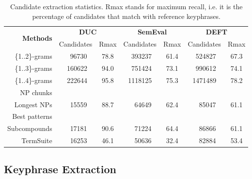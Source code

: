    \begin{table}[h]
      \centering
      \begin{tabular}{rcccccc}
        \toprule
        \multirow{2}{*}[-2pt]{\textbf{Methods}} & \multicolumn{2}{c}{\textbf{DUC}} & \multicolumn{2}{c}{\textbf{SemEval}} & \multicolumn{2}{c}{\textbf{DEFT}}\\
        \cmidrule(r){2-3}\cmidrule(lr){4-5}\cmidrule(l){6-7}
        & Candidates & Rmax & Candidates & Rmax & Candidates & Rmax\\
        \midrule
        \{1..2\}-grams & $~~~~$96730 & 78.8 & $~~$393237 & 61.4 & $~~$524827 & 67.3\\
        \{1..3\}-grams & $~~$160622 & 94.0 & $~~$751424 & 73.1 & $~~$990612 & 74.1\\
        \{1..4\}-grams & $~~$222644 & 95.8 & 1118125 & 75.3 & 1471489 & 78.2\\
        NP chunks & & & & & & \\
        Longest NPs & $~~~~$15559 & 88.7 & $~~~~$64649 & 62.4 & $~~~~$85047 & 61.1\\
        Best patterns & & & & & & \\
        Subcompounds & $~~~~$17181 & 90.6 & $~~~~$71224 & 64.4 & $~~~~$86866 & 61.1 \\
        TermSuite & $~~~~$16253 & 46.1 & $~~~~$50636 & 32.4 & $~~~~$82884 & 53.4\\
        \bottomrule
      \end{tabular}
      \caption{Candidate extraction statistics. Rmax stands for maximum recall,
               i.e. it is the percentage of candidates that match with reference
               keyphrases. \label{tab:candidate_extraction_statistics}}
    \end{table}


  \subsection{Keyphrase Extraction}
  \label{subsec:keyphrase_extraction}

